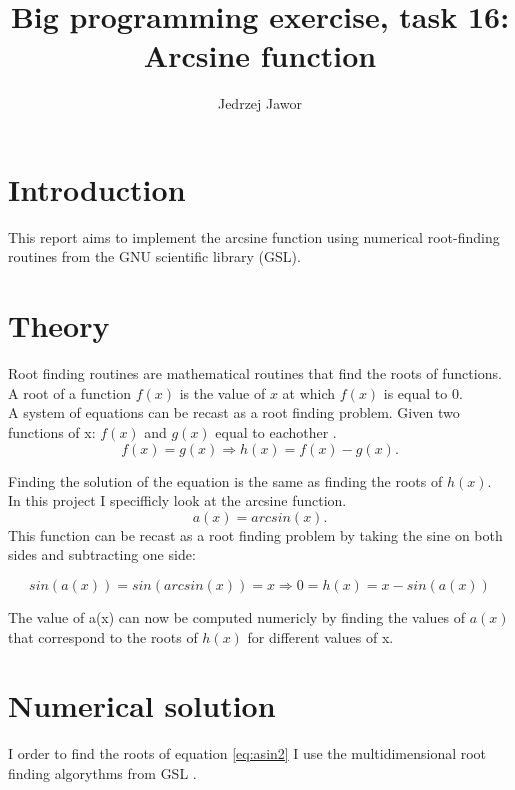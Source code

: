 \documentclass{article}
\begin{document}
\title{Big programming exercise, task 16: Arcsine function}
\author{Jedrzej Jawor}
\date{}
\maketitle

\section{Introduction}
This report aims to implement the arcsine function using numerical root-finding routines from the GNU scientific library (GSL).

\section{Theory}
Root finding routines are mathematical routines that find the roots of functions. A root of a function $f(x)$ is the value 
of $x$ at which $f(x)$ is equal to 0.
\\
A system of equations can be recast as a root finding problem. Given two functions of x: $f(x)$ and $g(x)$ equal to eachother 
\cite{wikiroots}.
\begin{equation}
\label{eq:1}
f(x)=g(x) \Rightarrow h(x)=f(x)-g(x).
\end{equation}

Finding the solution of the equation is the same as finding the roots of $h(x)$.
\\
In this project I specifficly look at the arcsine function.
\begin{equation}
\label{eq:asin}
a(x)=arcsin(x).
\end{equation}
This function can be recast as a root finding problem by taking the sine on both sides and subtracting one side:

\begin{equation}
\label{eq:asin2}
sin(a(x))=sin(arcsin(x)) = x \Rightarrow 0 = h(x) = x-sin(a(x))
\end{equation}

The value of a(x) can now be computed numericly by finding the values of $a(x)$ that correspond to the roots of $h(x)$ 
for different values of x.

\section{Numerical solution}
I order to find the roots of equation \ref{eq:asin2} I use the multidimensional root finding algorythms from GSL \cite{GSL}.
\end{document}
